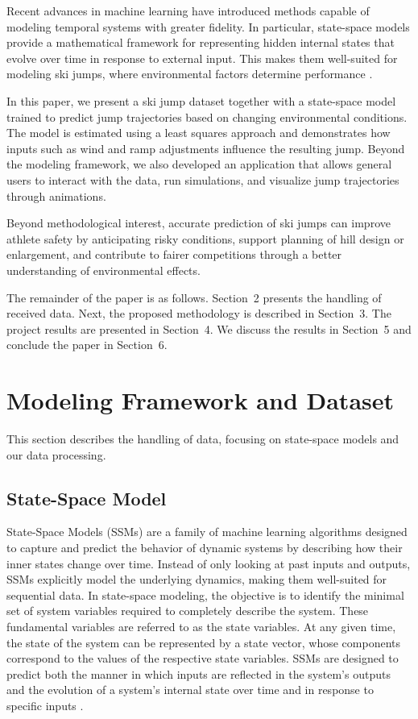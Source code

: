 \documentclass[sigconf]{acmart}
\begin{document}
Recent advances in machine learning have introduced methods capable of modeling
temporal systems with greater fidelity. In particular, state-space models
provide a mathematical framework for representing hidden internal states that
evolve over time in response to external input. This makes them well-suited for
modeling ski jumps, where environmental factors determine performance
\cite{serrano2025}.

In this paper, we present a ski jump dataset together with a state-space model
trained to predict jump trajectories based on changing environmental conditions.
The model is estimated using a least squares approach and demonstrates how
inputs such as wind and ramp adjustments influence the resulting jump. Beyond
the modeling framework, we also developed an application that allows general
users to interact with the data, run simulations, and visualize jump
trajectories through animations.

Beyond methodological interest, accurate prediction of ski jumps can improve
athlete safety by anticipating risky conditions, support planning of hill design
or enlargement, and contribute to fairer competitions through a better
understanding of environmental effects.

The remainder of the paper is as follows. Section~2 presents the handling of
received data. Next, the proposed methodology is described in Section~3. The
project results are presented in Section~4. We discuss the results in
Section~5 and conclude the paper in Section~6.

\section{Modeling Framework and Dataset}
This section describes the handling of data, focusing on state-space models and
our data processing.

\subsection{State-Space Model}
State-Space Models (SSMs) are a family of machine learning algorithms designed
to capture and predict the behavior of dynamic systems by describing how their
inner states change over time. Instead of only looking at past inputs and
outputs, SSMs explicitly model the underlying dynamics, making them well-suited
for sequential data. In state-space modeling, the objective is to identify the
minimal set of system variables required to completely describe the system.
These fundamental variables are referred to as the state variables. At any
given time, the state of the system can be represented by a state vector, whose
components correspond to the values of the respective state variables. SSMs are
designed to predict both the manner in which inputs are reflected in the
system’s outputs and the evolution of a system’s internal state over time and
in response to specific inputs \cite{aoki1990}.
\end{document}
